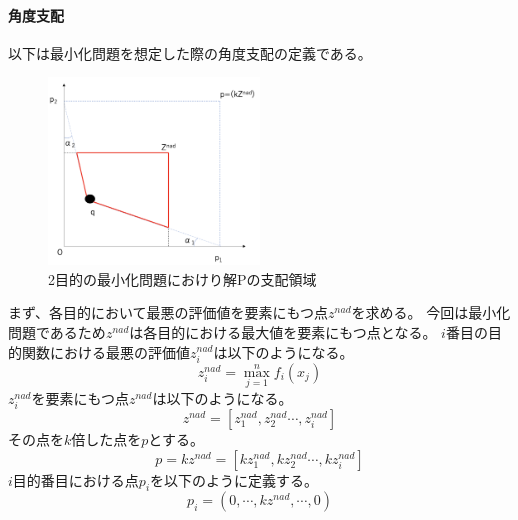\documentclass{rentai-chugoku}
\begin{document}
\paragraph{角度支配}
以下は最小化問題を想定した際の角度支配の定義である。
\begin{figure}[b]
\begin{center}
\includegraphics[width=0.5\textwidth]{angle-dominance.png}
\end{center}
\label{angle-dominance}
\caption{2目的の最小化問題におけり解Pの支配領域}
\end{figure}
まず、各目的において最悪の評価値を要素にもつ点$z^{nad}$を求める。
今回は最小化問題であるため$z^{nad}$は各目的における最大値を要素にもつ点となる。
$i$番目の目的関数における最悪の評価値$z^{nad}_i$は以下のようになる。
\begin{equation}
z^{nad}_{i} = \max^{n}_{j=1} f_i(x_j)
\end{equation}
$z^{nad}_i$を要素にもつ点$z^{nad}$は以下のようになる。
\begin{equation}
z^{nad}=\left[z^{nad}_1,z^{nad}_2 \cdots ,z^{nad}_i\right]
\end{equation}
その点を$k$倍した点を$p$とする。
\begin{equation}
p=kz^{nad}=\left[kz^{nad}_1,kz^{nad}_2 \cdots ,kz^{nad}_i\right]
\end{equation}
$i$目的番目における点$p_i$を以下のように定義する。
\begin{equation}
p_i=\left(0,\cdots,kz^{nad},\cdots,0\right)
\end{equation}
\end{document}
